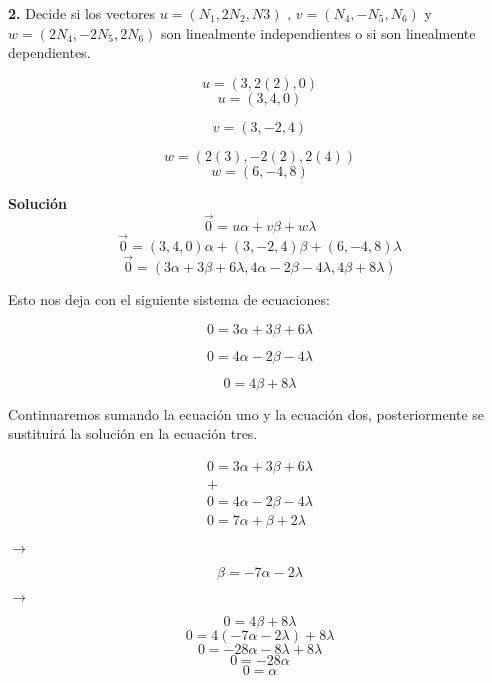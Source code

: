 \documentclass{article}
\begin{document}
\textbf{2.} Decide si los vectores $u = (N_1, 2N_2, N3)$ , $v = (N_4, -N_5, N_6)$ y $w = (2N_4, -2N_5, 2N_6)$
son linealmente independientes o si son linealmente dependientes.


\begin{minipage}[c]{0.5cm}
   $$u = (3, 2(2), 0)$$
   $$u = (3, 4, 0)$$
\end{minipage}\hspace*{3cm}
\begin{minipage}[c]{0.5cm}
   $$v = (3, -2, 4)$$
\end{minipage}\hspace*{3cm}
\begin{minipage}[c]{0.5cm}
   $$w= (2(3), -2(2), 2(4))$$
   $$w = (6, -4, 8)$$
\end{minipage}
\vspace*{10pt}


\textbf{Solución}
$$\vec{0} = u\alpha + v\beta + w\lambda$$
$$\vec{0} = (3, 4, 0)\alpha + (3, -2, 4)\beta + (6, -4, 8)\lambda$$
$$\vec{0} = (3\alpha+ 3\beta+ 6\lambda, 4\alpha-2\beta -4\lambda, 4\beta+ 8\lambda)$$


Esto nos deja con el siguiente sistema de ecuaciones:


\begin{minipage}[c]{0.5cm}
   $$0 = 3\alpha +3\beta+ 6\lambda$$
\end{minipage}\hspace*{3cm}
\begin{minipage}[c]{0.5cm}
   $$0 = 4\alpha-2\beta -4\lambda$$
\end{minipage}\hspace*{3cm}
\begin{minipage}[c]{0.5cm}
   $$0 = 4\beta+ 8\lambda$$
\end{minipage}
\vspace{10pt}


Continuaremos sumando la ecuación uno y la ecuación dos, posteriormente se sustituirá la solución en la
ecuación tres.


\begin{minipage}[c]{0.5cm}
   $$\begin{array}{c}
       0 = 3\alpha + 3\beta + 6\lambda \\
       + \\
       0 = 4\alpha-2\beta -4\lambda\\
       \hline
       0 = 7\alpha + \beta + 2\lambda
   \end{array}
   $$
\end{minipage}\hspace*{3cm}
$\rightarrow$
\hspace*{1.5cm}
\begin{minipage}[c]{0.5cm}
$$\beta = -7\alpha -2\lambda$$
\end{minipage}\hspace*{3cm}
$\rightarrow$
\hspace*{1.5cm}
\begin{minipage}[c]{0.5cm}
   $$0 = 4\beta+ 8\lambda$$
   $$0 = 4(-7\alpha -2\lambda) + 8\lambda$$
   $$0 = -28\alpha -8\lambda + 8\lambda$$
   $$0 = -28\alpha$$
   $$0 = \alpha$$
\end{minipage}
\vspace{10pt}
\end{document}
